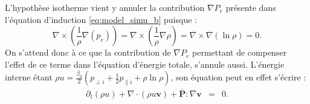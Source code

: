L'hypothèse isotherme vient y annuler la contribution $\nabla P_e$ présente dans l'équation d'induction \eqref{eq:model_simu_b} puisque : 
\begin{equation*}
     \nabla \times \left( \frac{1}{\rho} \nabla \left(  p_e\right) \right) =  \nabla \times \left( \frac{1}{\rho} \nabla  \rho \right) = \nabla \times  \nabla \left( \ln \rho \right) = 0.
\end{equation*}
On s'attend donc à ce que la contribution de $\nabla P_e$ permettant de compenser l'effet de ce terme dans l'équation d'énergie totale, s'annule aussi. L'énergie interne étant $\rho u = \frac{\beta_0}{2} \left(p_{\perp i } + \frac{1}{2}p_{\parallel i} + \rho \ln \rho \right) $, son équation peut en effet s'écrire :
\begin{eqnarray}
\label{eq:mcgl_ui} \partial_t \left(\rho u\right) + \nabla \cdot \left(\rho u \boldsymbol{v}\right) +  \overline{\boldsymbol{P}}: \nabla \boldsymbol{v} &=& 0.
\end{eqnarray}

